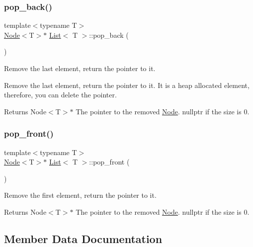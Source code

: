 \subsubsection{\texorpdfstring{pop\+\_\+back()}{pop\_back()}}
{\footnotesize\ttfamily template$<$typename T$>$ \\
\hyperlink{structNode}{Node}$<$T$>$$\ast$ \hyperlink{classList}{List}$<$ T $>$\+::pop\+\_\+back (\begin{DoxyParamCaption}{ }\end{DoxyParamCaption})\hspace{0.3cm}{\ttfamily [inline]}}



Remove the last element, return the pointer to it. 

Remove the last element, return the pointer to it. It is a heap allocated element, therefore, you can delete the pointer.

\begin{DoxyReturn}{Returns}
Node$<$\+T$>$$\ast$ The pointer to the removed \hyperlink{structNode}{Node}. nullptr if the size is 0. 
\end{DoxyReturn}
\mbox{\label{classList_a3188f038a0b9c0a578bccdf7348f42b5}} 
\subsubsection{\texorpdfstring{pop\+\_\+front()}{pop\_front()}}
{\footnotesize\ttfamily template$<$typename T$>$ \\
\hyperlink{structNode}{Node}$<$T$>$$\ast$ \hyperlink{classList}{List}$<$ T $>$\+::pop\+\_\+front (\begin{DoxyParamCaption}{ }\end{DoxyParamCaption})\hspace{0.3cm}{\ttfamily [inline]}}



Remove the first element, return the pointer to it. 

\begin{DoxyReturn}{Returns}
Node$<$\+T$>$$\ast$ The pointer to the removed \hyperlink{structNode}{Node}. nullptr if the size is 0. 
\end{DoxyReturn}


\subsection{Member Data Documentation}
\mbox{\label{classList_a36398f758397060735c8df9f7d11235d}} 
